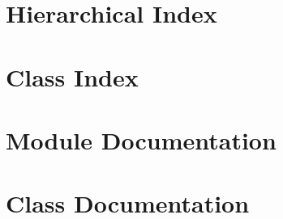 \documentclass[twoside]{book}
\newcommand{\+}{\discretionary{\mbox{\scriptsize$\hookleftarrow$}}{}{}}
\newcommand{\clearemptydoublepage}{%
  \newpage{\pagestyle{empty}\cleardoublepage}%
}
\begin{document}
\chapter{Hierarchical Index}

\chapter{Class Index}

\chapter{Module Documentation}

\chapter{Class Documentation}














\backmatter
\newpage
{}
\clearemptydoublepage
{}
\printindex
\end{document}
